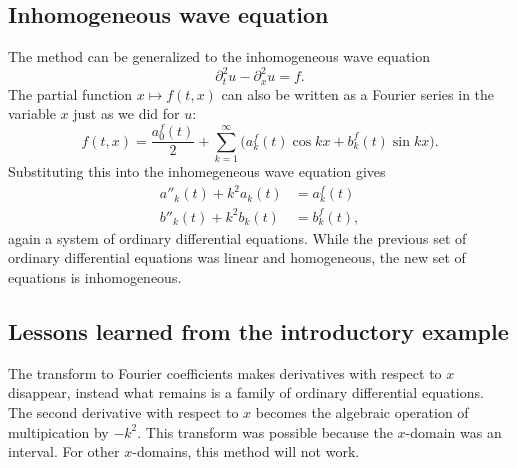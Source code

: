 \subsection{Inhomogeneous wave equation}
The method can be generalized to the inhomogeneous wave equation
\[
\partial_t^2u-\partial_x^2u=f.
\]
The partial function $x\mapsto f(t,x)$ can also be written 
as a Fourier series in the variable $x$ just as we did for $u$:
\[
f(t,x)
=
\frac{a_0^f(t)}2
+
\sum_{k=1}^\infty \bigl( a_k^f(t)\cos kx+b_k^f(t)\sin kx \bigr).
\]
Substituting this into the inhomegeneous wave equation gives
\begin{align*}
a''_k(t)+k^2a_k(t)&=a_k^f(t)\\
b''_k(t)+k^2b_k(t)&=b_k^f(t),
\end{align*}
again a system of ordinary differential equations.
While the previous set of ordinary differential equations was linear
and homogeneous, the new set of equations is inhomogeneous.

\subsection{Lessons learned from the introductory example}
The transform to Fourier coefficients makes derivatives with respect
to $x$ disappear, instead what remains is a family of ordinary
differential equations.
The second derivative with respect to $x$ becomes the algebraic
operation of multipication by $-k^2$.
This transform was possible because the $x$-domain was an interval.
For other $x$-domains, this method will not work.

